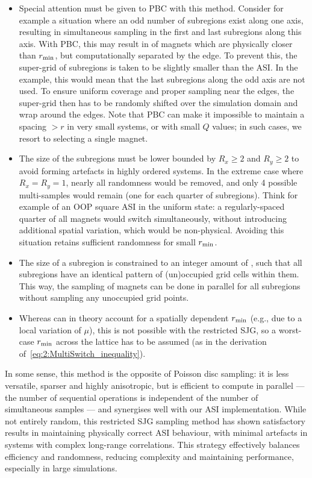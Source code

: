 \begin{itemize}[partopsep=0pt]
	\item Special attention must be given to PBC with this method.
	Consider for example a situation where an odd number of subregions exist along one axis, resulting in simultaneous sampling in the first and last subregions along this axis.
	With PBC, this may result in  of magnets which are physically closer than $r_\mathrm{min}$, but computationally separated by the edge.
	To prevent this, the super-grid of subregions is taken to be slightly smaller than the ASI.
	In the example, this would mean that the last subregions along the odd axis are not used.
	To ensure uniform coverage and proper sampling near the edges, the super-grid then has to be randomly shifted over the simulation domain and wrap around the edges.
	Note that PBC can make it impossible to maintain a spacing $>r$ in very small systems, or with small $Q$ values; in such cases, we resort to selecting a single magnet.
	\item The size of the subregions must be lower bounded by $R_x \geq 2$ and $R_y \geq 2$ to avoid forming artefacts in highly ordered systems.
	In the extreme case where $R_x = R_y = 1$, nearly all randomness would be removed, and only 4 possible multi-samples would remain (one for each quarter of subregions).
	Think for example of an  OOP square ASI in the uniform state: a regularly-spaced quarter of all magnets would switch simultaneously, without introducing additional spatial variation, which would be non-physical.
	Avoiding this situation retains sufficient randomness for small $r_\mathrm{min}$.
	\item The size of a subregion is constrained to an integer amount of , such that all subregions have an identical pattern of (un)occupied grid cells within them.
	This way, the sampling of magnets can be done in parallel for all subregions without sampling any unoccupied grid points.
	\item Whereas  can in theory account for a spatially dependent $r_\mathrm{min}$ (e.g., due to a local variation of $\mu$), this is not possible with the restricted SJG, so a worst-case $r_\mathrm{min}$ across the lattice has to be assumed (as in the derivation of~\cref{eq:2:MultiSwitch_inequality}).
\end{itemize}
\par
In some sense, this method is the opposite of Poisson disc sampling: it is less versatile, sparser and highly anisotropic, but is efficient to compute in parallel --- the number of sequential operations is independent of the number of simultaneous samples --- and synergises well with our  ASI implementation.
While not entirely random, this restricted SJG sampling method has shown satisfactory results in maintaining physically correct ASI behaviour, with minimal artefacts in systems with complex long-range correlations.
This strategy effectively balances efficiency and randomness, reducing complexity and maintaining performance, especially in large simulations.

